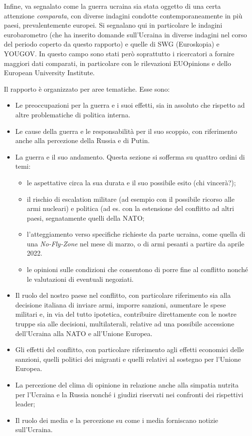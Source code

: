 \documentclass[
]{book}
\providecommand{\tightlist}{%
  \setlength{\itemsep}{0pt}\setlength{\parskip}{0pt}}
\begin{document}
Infine, va segnalato come la guerra ucraina sia stata oggetto di una certa attenzione \emph{comparata}, con diverse indagini condotte contemporaneamente in più paesi, prevalentemente europei. Si segnalano qui in particolare le indagini eurobarometro (che ha inserito domande sull'Ucraina in diverse indagini nel corso del periodo coperto da questo rapporto) e quelle di SWG (Euroskopia) e YOUGOV. In questo campo sono stati però soprattutto i ricercatori a fornire maggiori dati comparati, in particolare con le rilevazioni EUOpinions e dello European University Institute.

Il rapporto è organizzato per aree tematiche. Esse sono:

\begin{itemize}
\item
  Le preoccupazioni per la guerra e i suoi effetti, sia in assoluto che rispetto ad altre problematiche di politica interna.
\item
  Le cause della guerra e le responsabilità per il suo scoppio, con riferimento anche alla percezione della Russia e di Putin.
\item
  La guerra e il suo andamento. Questa sezione si sofferma su quattro ordini di temi:

  \begin{itemize}
  \tightlist
  \item
    le aspettative circa la sua durata e il suo possibile esito (chi vincerà?);
  \item
    il rischio di escalation militare (ad esempio con il possibile ricorso alle armi nucleari) e politica (ad es. con la estensione del conflitto ad altri paesi, segnatamente quelli della NATO;
  \item
    l'atteggiamento verso specifiche richieste da parte ucraina, come quella di una \emph{No-Fly-Zone} nel mese di marzo, o di armi pesanti a partire da aprile 2022.
  \item
    le opinioni sulle condizioni che consentono di porre fine al conflitto nonché le valutazioni di eventuali negoziati.
  \end{itemize}
\item
  Il ruolo del nostro paese nel conflitto, con particolare riferimento sia alla decisione italiana di inviare armi, imporre sanzioni, aumentare le spese militari e, in via del tutto ipotetica, contribuire direttamente con le nostre truppe sia alle decisioni, multilaterali, relative ad una possibile accessione dell'Ucraina alla NATO e all'Unione Europea.
\item
  Gli effetti del conflitto, con particolare riferimento agli effetti economici delle sanzioni, quelli politici dei migranti e quelli relativi al sostegno per l'Unione Europea.
\item
  La percezione del clima di opinione in relazione anche alla simpatia nutrita per l'Ucraina e la Russia nonché i giudizi riservati nei confronti dei rispettivi leader;
\item
  Il ruolo dei media e la percezione su come i media forniscano notizie sull'Ucraina.
\end{itemize}
\end{document}
